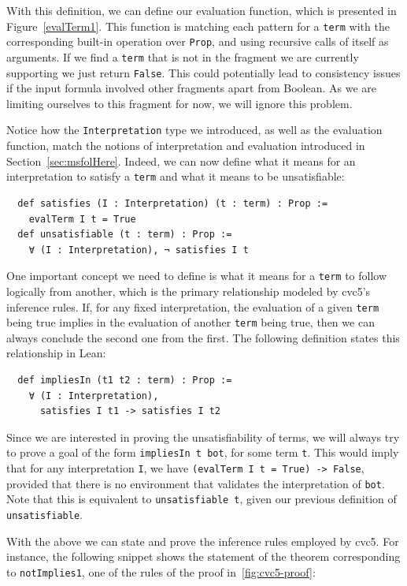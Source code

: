With this definition, we can define our evaluation function, which is presented in
Figure~\ref{evalTerm1}.
This function is matching each pattern for a \texttt{term} with the corresponding built-in operation over \texttt{Prop}, and using recursive calls of itself as arguments. If we find a \texttt{term} that is not in the fragment we are currently supporting we just return \texttt{False}. This could potentially lead to consistency issues if the input formula involved other fragments apart from Boolean. As we are limiting ourselves to this fragment for now, we will ignore this problem.

Notice how the \texttt{Interpretation} type we introduced, as well as the evaluation function, match the notions of interpretation and evaluation introduced in Section~\ref{sec:msfolHere}. Indeed, we can now define what it means for an interpretation to satisfy a \texttt{term} and what it means to be unsatisfiable:

\begin{verbatim}
  def satisfies (I : Interpretation) (t : term) : Prop :=
    evalTerm I t = True
  def unsatisfiable (t : term) : Prop :=
    ∀ (I : Interpretation), ¬ satisfies I t
\end{verbatim}

One important concept we need to define is what it means for a \texttt{term}
to follow logically from another, which is the primary relationship modeled
by cvc5's inference rules.
%
If, for any fixed interpretation, the evaluation of a given \texttt{term} being true
implies in the evaluation of another \texttt{term} being true, then we can always
conclude the second one from the first. The following definition states this
relationship in Lean:

\begin{verbatim}
  def impliesIn (t1 t2 : term) : Prop :=
    ∀ (I : Interpretation),
      satisfies I t1 -> satisfies I t2
\end{verbatim}

Since we are interested in proving the unsatisfiability of terms, we will always try to prove a goal of the form \texttt{impliesIn t bot}, for some term \texttt{t}. This would imply that for any interpretation \texttt{I}, we have \texttt{(evalTerm I t = True) -> False}, provided that there is no environment that validates the interpretation of \texttt{bot}. Note that this is equivalent to \texttt{unsatisfiable t}, given our previous definition of \texttt{unsatisfiable}.

With the above we can state and prove the inference rules employed by cvc5.
%
For instance, the following snippet shows the statement of the theorem corresponding
to \texttt{notImplies1}, one of the rules of the proof in~\ref{fig:cvc5-proof}:

